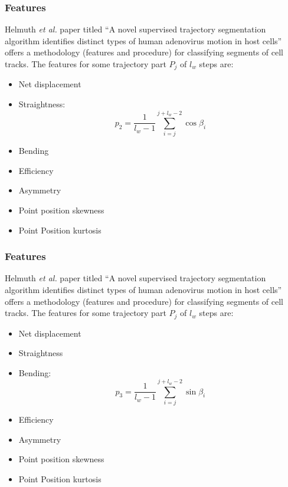 \documentclass[8pt]{beamer}
\begin{document}
\begin{frame}
  \frametitle{Features}
  Helmuth \emph{et al.} paper titled ``A novel supervised trajectory
  segmentation algorithm identifies distinct types of human adenovirus
  motion in host cells'' offers a methodology (features and procedure)
  for classifying segments of cell tracks.
  The features for some trajectory part $P_j$ of $l_w$ steps are:
  \begin{itemize}
  \item Net displacement
  \item Straightness: 
    \begin{equation*}
      p_2 = \frac{1}{l_w - 1} \sum_{i=j}^{j + l_w - 2} \cos{\beta_i}
    \end{equation*}
  \item Bending
  \item Efficiency
  \item Asymmetry
  \item Point position skewness
  \item Point Position kurtosis
  \end{itemize}
\end{frame}

\begin{frame}
  \frametitle{Features}
  Helmuth \emph{et al.} paper titled ``A novel supervised trajectory
  segmentation algorithm identifies distinct types of human adenovirus
  motion in host cells'' offers a methodology (features and procedure)
  for classifying segments of cell tracks.
  The features for some trajectory part $P_j$ of $l_w$ steps are:
  \begin{itemize}
  \item Net displacement
  \item Straightness
  \item Bending: 
    \begin{equation*}
      p_3 = \frac{1}{l_w - 1} \sum_{i=j}^{j + l_w - 2} \sin{\beta_i}
    \end{equation*}
  \item Efficiency
  \item Asymmetry
  \item Point position skewness
  \item Point Position kurtosis
  \end{itemize}
\end{frame}
\end{document}
